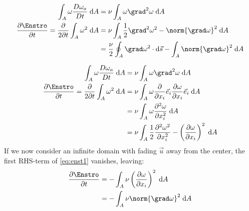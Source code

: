 \subsubsection{}


\begin{equation}\begin{split}
	\int_A \omega \frac{D \omega_{a}}{D t}\; \mathrm{d}A
	&=
	\nu\int_A  \omega \grad^{2} \omega\; \mathrm{d}A\\
	\frac{\partial \Enstro}{\partial t}
	=
	\frac{\partial }{2\partial t} \int_A \omega^2 \; \mathrm{d}A
	&=
	\nu\int_A \frac{1}{2}\grad^{2} \omega^{2} - \norm{\grad \omega}^2  \; \mathrm{d}A \\
	&=
	\frac{\nu}{2}\oint_A \grad \omega^{2} \cdot \mathrm{d}\vec{s}
	- \int_A\norm{\grad \omega}^2  \; \mathrm{d}A \label{eq:enst1}	\\
\end{split}\end{equation}


\begin{equation}\begin{split}
	\int_A \omega \frac{D \omega_{a}}{D t}\; \mathrm{d}A
	&=
	\nu\int_A  \omega \grad^{2} \omega\; \mathrm{d}A\\
	\frac{\partial \Enstro}{\partial t}
	=
	\frac{\partial }{2\partial t} \int_A \omega^2 \; \mathrm{d}A
	&=
	\nu\int_A \omega  \frac{\partial }{\partial x_i} \vec{e}_i \frac{\partial  \omega}{\partial x_i} \vec{e}_i\; \mathrm{d}A \\
	&=
	\nu\int_A \omega  \frac{\partial^2  \omega}{\partial x_i^2} \; \mathrm{d}A \\
	&=
	\nu\int_A \frac{1}{2} \frac{\partial^2 \omega^2 }{\partial x_i^2}  - \left(\frac{\partial  \omega}{\partial x_i} \right)^2 \; \mathrm{d}A \label{eq:enst1}
\end{split}\end{equation}
If we now consider an infinite domain with fading $\vec{u}$ away from the center,
the first RHS-term of \eqref{eq:enst1} vanishes, leaving:
\begin{equation}\begin{split}
	\frac{\partial \Enstro}{\partial t}
	&=
	- \int_A \nu\left(\frac{\partial  \omega}{\partial x_i} \right)^2 \; \mathrm{d}A \\
	&=
	- \int_A \nu\norm{ \grad \omega}^2 \; \mathrm{d}A
\end{split}\end{equation}



